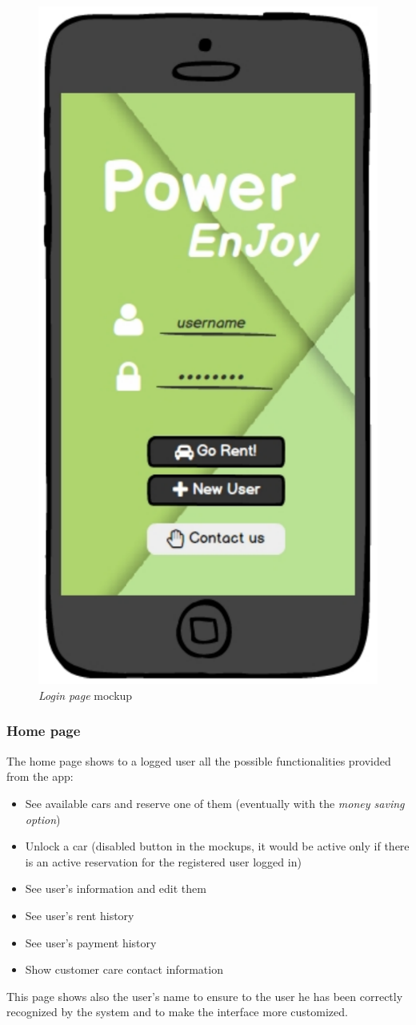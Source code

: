 	\begin{figure}[h]
			\centering
			\includegraphics[width=0.4\linewidth]{mockups/loginPage}
			\caption{
				\label{fig:loginPage} 
				\emph{Login page} mockup
			}
		\end{figure}
		
\clearpage

\subsubsection{Home page}
The home page shows to a logged user all the possible functionalities provided from the app:
\begin{itemize}
	\item See available cars and reserve one of them (eventually with the \emph{money saving option})
	\item Unlock a car (disabled button in the mockups, it would be active only if there is an active reservation for the registered user logged in)
	\item See user's information and edit them
	\item See user's rent history
	\item See user's payment history
	\item Show customer care contact information
\end{itemize}

This page shows also the user's name to ensure to the user he has been correctly recognized by the system and to make the interface more customized. \\

